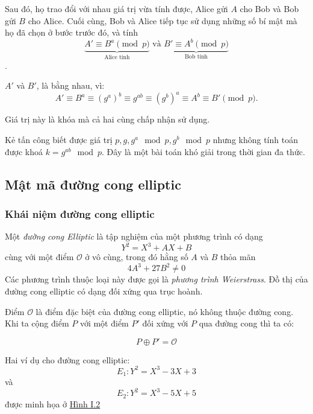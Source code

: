 Sau đó, họ trao đổi với nhau giá trị vừa tính được, Alice gửi $A$ cho Bob và Bob gửi $B$ cho Alice. 
Cuối cùng, Bob và Alice tiếp tục sử dụng những số bí mật mà họ đã chọn ở bước trước đó, và tính
$$\underbrace{A' \equiv B^a \pmod{p}}_{\text{Alice tính}} \text{ và } \underbrace{B' \equiv A^b \pmod{p}}_{\text{Bob tính}}$$.

$A'$ và $B'$, là bằng nhau, vì:
$$A' \equiv B^a \equiv (g^a)^b \equiv g^{ab} \equiv (g^b)^a \equiv A^b \equiv B' \pmod{p}.$$

Giá trị này là khóa mà cả hai cùng chấp nhận sử dụng.

Kẻ tấn công biết được giá trị $p,g,g^a \mod p, g^b \mod p $ nhưng không 
tính toán được khoá $k = g^{ab} \mod p$. Đây là một bài toán khó giải 
trong thời gian đa thức. \cite{elliptic}

\subsection{Mật mã đường cong elliptic}
\subsubsection{Khái niệm đường cong elliptic}

Một \textit{đường cong Elliptic} là tập nghiệm của một phương trình có dạng
$$Y^2 = X^3 + AX + B$$ cùng với một điểm $\mathcal{O}$ ở vô cùng, trong đó hằng số $A$ và $B$ thỏa mãn
$$ 4A^3 + 27B^2 \neq 0$$
Các phương trình thuộc loại này được gọi là \textit{phương trình Weierstrass}. 
Đồ thị của đường cong elliptic có dạng đối xứng qua trục hoành. \cite{elliptic}

Điểm $\mathcal{O}$ là điểm đặc biệt của đường cong elliptic, nó không thuộc đường cong.
Khi ta cộng điểm $P$ với một điểm $P'$ đối xứng với $P$ qua đường cong thì ta có:

$$ P \oplus P' = \mathcal{O}$$

Hai ví dụ cho đường cong elliptic:
$$ E_1: Y^2=X^3-3X+3 $$ và $$ E_2: Y^2=X^3-5X+5 $$ được minh họa ở \hyperref[fg:fg1]{Hình I.2}

